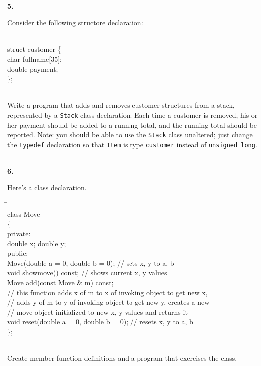 \documentclass[10 pt]{amsart}
\newlength{\cwidth}
\newenvironment{cpart}[2][\cwidth]
	{\\ \phantom{\qquad}\textbf{#2. }\begin{minipage}[t]{#1}}
	{\end{minipage}}
\newcommand{\ttt}[1]{\texttt{#1}}
\begin{document}
	\begin{cpart}{5}
		Consider the following structore declaration: 
		{\ttfamily
			\begin{tabbing}
				\phantom{\qquad}\= \\
				struct customer \{ \\
				\> 	char fullname[35]; \\
				\> 	double payment; \\
				\};
			\end{tabbing}
		}
		\phantom{\quad} \\
		Write a program that adds and removes customer structures from
		a stack, represented by a \ttt{Stack} class declaration.
		Each time a customer is removed, his or her payment should
		be added to a running total, and the running total
		should be reported.
		Note: you should be able to use the \ttt{Stack} class
		unaltered; just change the \ttt{typedef} declaration so 
		that \ttt{Item} is type \ttt{customer} instead of 	
		\ttt{unsigned long}.
	\end{cpart}
	\vspace{2ex}

	\begin{cpart}{6}
		Here's a class declaration. 
		{\ttfamily
			\begin{tabbing}
				\phantom{\qquad}\=\hspace{8cm}\= \\
				class Move \\
				\{ \\
				private:
				\+ \\
					double x;
					double y;
				\- \\
				public:
				\+ \\
				Move(double a = 0, double b = 0); \> // sets x, y to a, b \\
				void showmove() const; \> // shows current x, y values \\
				Move add(const Move & m) const;
				\- \\
				// this function adds x of m to x of invoking object 
					to get new x, \\
				// adds y of m to y of invoking object to get new y, 
					creates a new \\
				// move object initialized to new x, y values and
					returns it \\
				\> 	void reset(double a = 0, double b = 0); 
					\> // resets x, y to a, b \\
				\};
			\end{tabbing}
		}
		\phantom{\quad} \\
		Create member function definitions and a program that 
		exercises the class.
	\end{cpart}
	\vspace{2ex}
\end{document}
